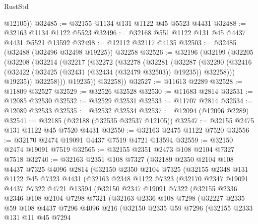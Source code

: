\begin{lexlean}{RustStd}
\begin{coremodule}
        @12105))
@32485 := @32155 @1134 @131 @1122 @45 @5523 @4431
@32488 := @32163 @1134 @1122 @5523
@32496 := @32168 @551 @1122 @131 @45 @4437 @4431 @5521 @13592
@32498 := @12112 @32117 @4135
@32503 := @32485 (@32488 (@32496 @32498 @19225)) @32258
@32526 := @32196
    (@32199
      (@32205
        (@32208
          (@32214
            (@32217
              (@32272
                (@32278
                  (@32281
                    (@32287
                      (@32290
                        (@32416 (@32422 (@32425 (@32431 (@32434 (@32479 @32503)) @19235)) @32258)))
                      @19235))
                  @32258)))
            @19235))
        @32258))
@32527 := @11613 @2289
@32528 := @11809 @32527
@32529 := @32526 @32528
@32530 := @11683 @2814
@32531 := @12085 @32530
@32532 := @32529 @32531
@32533 := @11707 @2814
@32534 := @12089 @32533
@32535 := @32532 @32534
@32537 := @12094 (@12096 @2289)
@32541 := @32185 (@32188 (@32535 @32537 @12105))
@32547 := @32155 @2475 @131 @1122 @45 @7520 @4431
@32550 := @32163 @2475 @1122 @7520
@32556 := @32170 @2474 @19091 @4437 @7519 @4721 @13594
@32559 := @32150 @2474 @19091 @7519
@32565 := @32155 @2351 @2473 @108 @2104 @7327 @7518
@32740 := @32163
    @2351
    @108
    @7327
    (@32189
      @2350
      @2104
      @108
      @4437
      @7325
      @4096
      @2814
      (@32150
        @2350
        @2104
        @7325
        (@32155
          @2348
          @131
          @1122
          @45
          @7323
          @4431
          (@32163
            @2348
            @1122
            @7323
            (@32170
              @2347
              @19091
              @4437
              @7322
              @4721
              @13594
              (@32150
                @2347
                @19091
                @7322
                (@32155
                  @2336
                  @2346
                  @108
                  @2104
                  @7298
                  @7321
                  (@32163
                    @2336
                    @108
                    @7298
                    (@32227
                      @2335
                      @59
                      @108
                      @4437
                      @7296
                      @4096
                      @216
                      (@32150
                        @2335
                        @59
                        @7296
                        (@32155
                          @2333
                          @131
                          @11
                          @45
                          @7294

\end{coremodule}
\end{lexlean}
